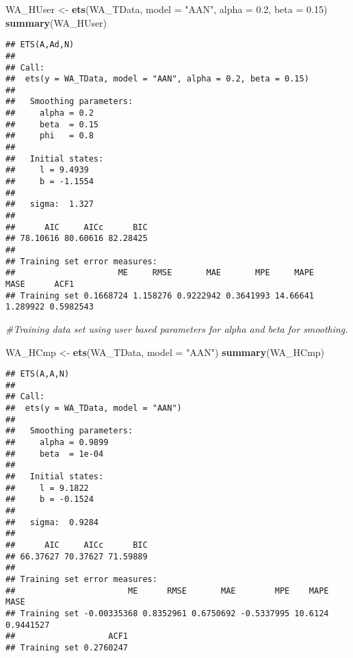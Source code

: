 \documentclass[
]{article}
\newenvironment{Shaded}{\begin{snugshade}}{\end{snugshade}}
\newcommand{\CommentTok}[1]{\textcolor[rgb]{0.56,0.35,0.01}{\textit{#1}}}
\newcommand{\DataTypeTok}[1]{\textcolor[rgb]{0.13,0.29,0.53}{#1}}
\newcommand{\FloatTok}[1]{\textcolor[rgb]{0.00,0.00,0.81}{#1}}
\newcommand{\KeywordTok}[1]{\textcolor[rgb]{0.13,0.29,0.53}{\textbf{#1}}}
\newcommand{\NormalTok}[1]{#1}
\newcommand{\StringTok}[1]{\textcolor[rgb]{0.31,0.60,0.02}{#1}}
\begin{document}
\begin{Shaded}
\begin{Highlighting}[]
\NormalTok{WA_HUser <-}\StringTok{ }\KeywordTok{ets}\NormalTok{(WA_TData, }\DataTypeTok{model =} \StringTok{"AAN"}\NormalTok{, }\DataTypeTok{alpha =} \FloatTok{0.2}\NormalTok{, }\DataTypeTok{beta =} \FloatTok{0.15}\NormalTok{)}
\KeywordTok{summary}\NormalTok{(WA_HUser)}
\end{Highlighting}
\end{Shaded}

\begin{verbatim}
## ETS(A,Ad,N) 
## 
## Call:
##  ets(y = WA_TData, model = "AAN", alpha = 0.2, beta = 0.15) 
## 
##   Smoothing parameters:
##     alpha = 0.2 
##     beta  = 0.15 
##     phi   = 0.8 
## 
##   Initial states:
##     l = 9.4939 
##     b = -1.1554 
## 
##   sigma:  1.327
## 
##      AIC     AICc      BIC 
## 78.10616 80.60616 82.28425 
## 
## Training set error measures:
##                     ME     RMSE       MAE       MPE     MAPE     MASE      ACF1
## Training set 0.1668724 1.158276 0.9222942 0.3641993 14.66641 1.289922 0.5982543
\end{verbatim}

\begin{Shaded}
\begin{Highlighting}[]
\CommentTok{#Training data set using user based parameters for alpha and beta for smoothing.}
\end{Highlighting}
\end{Shaded}

\begin{Shaded}
\begin{Highlighting}[]
\NormalTok{WA_HCmp <-}\StringTok{ }\KeywordTok{ets}\NormalTok{(WA_TData, }\DataTypeTok{model =} \StringTok{"AAN"}\NormalTok{)}
\KeywordTok{summary}\NormalTok{(WA_HCmp)}
\end{Highlighting}
\end{Shaded}

\begin{verbatim}
## ETS(A,A,N) 
## 
## Call:
##  ets(y = WA_TData, model = "AAN") 
## 
##   Smoothing parameters:
##     alpha = 0.9899 
##     beta  = 1e-04 
## 
##   Initial states:
##     l = 9.1822 
##     b = -0.1524 
## 
##   sigma:  0.9284
## 
##      AIC     AICc      BIC 
## 66.37627 70.37627 71.59889 
## 
## Training set error measures:
##                       ME      RMSE       MAE        MPE    MAPE      MASE
## Training set -0.00335368 0.8352961 0.6750692 -0.5337995 10.6124 0.9441527
##                   ACF1
## Training set 0.2760247
\end{verbatim}
\end{document}
